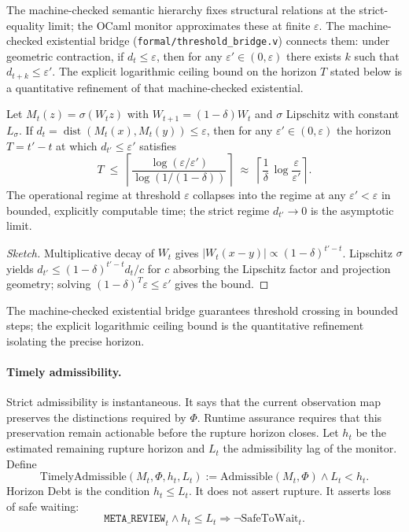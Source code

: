\documentclass{llncs}
\DeclareMathOperator{\dist}{dist}
\begin{document}
The machine-checked semantic hierarchy fixes structural relations at the
strict-equality limit; the OCaml monitor approximates these at finite
$\varepsilon$. The machine-checked existential bridge
(\texttt{formal/\allowbreak{}threshold\_bridge.v}) connects them: under geometric
contraction, if $d_t \leq \varepsilon$, then for any $\varepsilon' \in
(0, \varepsilon)$ there exists $k$ such that $d_{t+k} \leq \varepsilon'$.
The explicit logarithmic ceiling bound on the horizon $T$ stated below
is a quantitative refinement of that machine-checked existential.

\begin{lemma}
\label{lem:opbound}
Let $M_t(z) = \sigma(W_t z)$ with $W_{t+1} = (1-\delta) W_t$ and
$\sigma$ Lipschitz with constant $L_\sigma$. If $d_t = \dist(M_t(x),
M_t(y)) \leq \varepsilon$, then for any $\varepsilon' \in (0,
\varepsilon)$ the horizon $T = t' - t$ at which $d_{t'} \leq
\varepsilon'$ satisfies
\[
  T \;\leq\;
    \left\lceil
      \frac{\log(\varepsilon / \varepsilon')}{\log(1 / (1-\delta))}
    \right\rceil
    \;\approx\;
    \left\lceil
      \frac{1}{\delta}\,\log\!\frac{\varepsilon}{\varepsilon'}
    \right\rceil .
\]
The operational regime at threshold $\varepsilon$ collapses into the
regime at any $\varepsilon' < \varepsilon$ in bounded, explicitly
computable time; the strict regime $d_{t'} \to 0$ is the asymptotic
limit.
\end{lemma}

\begin{proof}[Sketch]
Multiplicative decay of $W_t$ gives $|W_t(x - y)| \propto (1-\delta)^{t'
- t}$. Lipschitz $\sigma$ yields $d_{t'} \leq (1-\delta)^{t' - t} d_t /
c$ for $c$ absorbing the Lipschitz factor and projection geometry;
solving $(1-\delta)^T \varepsilon \leq \varepsilon'$ gives the bound.
\end{proof}

The machine-checked existential bridge guarantees threshold crossing in
bounded steps; the explicit logarithmic ceiling bound is the quantitative
refinement isolating the precise horizon.

\paragraph{Timely admissibility.}
Strict admissibility is instantaneous. It says that the current observation map preserves the distinctions required by \(\Phi\). Runtime assurance requires that this preservation remain actionable before the rupture horizon closes. Let \(h_t\) be the estimated remaining rupture horizon and \(L_t\) the admissibility lag of the monitor. Define
\[
\mathrm{TimelyAdmissible}(M_t,\Phi,h_t,L_t)
:=
\mathrm{Admissible}(M_t,\Phi)\wedge L_t<h_t.
\]
Horizon Debt is the condition \(h_t\leq L_t\). It does not assert rupture. It asserts loss of safe waiting:
\[
\mathtt{META\_REVIEW}_t \wedge h_t\leq L_t
\Rightarrow \neg \mathrm{SafeToWait}_t .
\]
\end{document}
